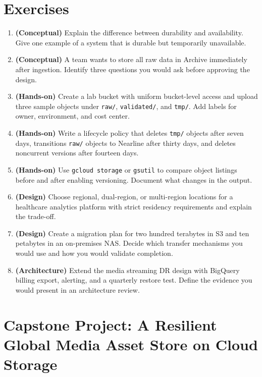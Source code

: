 \section{Exercises}
\begin{enumerate}
    \item \textbf{(Conceptual)} Explain the difference between durability and availability. Give one example of a system that is durable but temporarily unavailable.
    \item \textbf{(Conceptual)} A team wants to store all raw data in Archive immediately after ingestion. Identify three questions you would ask before approving the design.
    \item \textbf{(Hands-on)} Create a lab bucket with uniform bucket-level access and upload three sample objects under \texttt{raw/}, \texttt{validated/}, and \texttt{tmp/}. Add labels for owner, environment, and cost center.
    \item \textbf{(Hands-on)} Write a lifecycle policy that deletes \texttt{tmp/} objects after seven days, transitions \texttt{raw/} objects to Nearline after thirty days, and deletes noncurrent versions after fourteen days.
    \item \textbf{(Hands-on)} Use \texttt{gcloud storage} or \texttt{gsutil} to compare object listings before and after enabling versioning. Document what changes in the output.
    \item \textbf{(Design)} Choose regional, dual-region, or multi-region locations for a healthcare analytics platform with strict residency requirements and explain the trade-off.
    \item \textbf{(Design)} Create a migration plan for two hundred terabytes in S3 and ten petabytes in an on-premises NAS. Decide which transfer mechanisms you would use and how you would validate completion.
    \item \textbf{(Architecture)} Extend the media streaming DR design with BigQuery billing export, alerting, and a quarterly restore test. Define the evidence you would present in an architecture review.
\end{enumerate}

\section{Capstone Project: A Resilient Global Media Asset Store on Cloud Storage}\label{sec:ch1-capstone}

